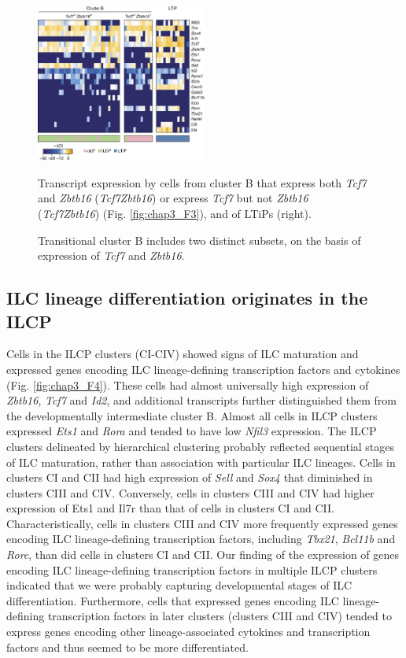 \begin{figure}[h]
\begin{center}
	\includegraphics[width=0.5\textwidth]{figures/chapter3/F5}
\end{center}
	\caption{Transitional cluster B includes two distinct subsets, on the basis of expression of \textit{Tcf7} and \textit{Zbtb16}.} 
	Transcript expression by cells from cluster B that express both \textit{Tcf7} and \textit{Zbtb16} (\textit{Tcf7}\UP \textit{Zbtb16}\UP) or express \textit{Tcf7} but not \textit{Zbtb16} (\textit{Tcf7}\UP \textit{Zbtb16}\UM) (Fig. \ref{fig:chap3_F3}), and of LTiPs (right).
	\label{fig:chap3_F5}
\end{figure}

\subsection{ILC lineage differentiation originates in the ILCP}

Cells in the ILCP clusters (CI-CIV) showed signs of ILC maturation and expressed genes encoding ILC lineage-defining transcription factors and cytokines (Fig. \ref{fig:chap3_F4}). These cells had almost universally high expression of \textit{Zbtb16}, \textit{Tcf7} and \textit{Id2}, and additional transcripts further distinguished them from the developmentally intermediate cluster B. Almost all cells in ILCP clusters expressed \textit{Ets1} and \textit{Rora} and tended to have low \textit{Nfil3} expression. The ILCP clusters delineated by hierarchical clustering probably reflected sequential stages of ILC maturation, rather than association with particular ILC lineages. Cells in clusters CI and CII had high expression of \textit{Sell} and \textit{Sox4} that diminished in clusters CIII and CIV. Conversely, cells in clusters CIII and CIV had higher expression of Ets1 and Il7r than that of cells in clusters CI and CII. Characteristically, cells in clusters CIII and CIV more frequently expressed genes encoding ILC lineage-defining transcription factors, including \textit{Tbx21}, \textit{Bcl11b} and \textit{Rorc}, than did cells in clusters CI and CII. Our finding of the expression of genes encoding ILC lineage-defining transcription factors in multiple ILCP clusters indicated that we were probably capturing developmental stages of ILC differentiation. Furthermore, cells that expressed genes encoding ILC lineage-defining transcription factors in later clusters (clusters CIII and CIV) tended to express genes encoding other lineage-associated cytokines and transcription factors and thus seemed to be more differentiated.

